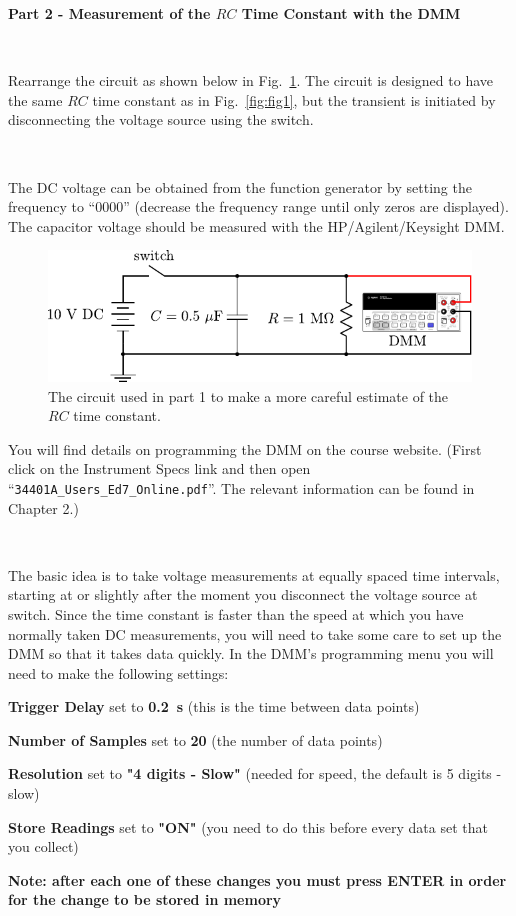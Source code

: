 \documentclass[12pt,oneside,openany,letterpaper]{article}
\newenvironment{packed_item}{
\begin{itemize}
  \setlength{\itemsep}{0pt}
  \setlength{\parskip}{0pt}
  \setlength{\parsep}{0pt}
}{\end{itemize}}
\begin{document}
\clearpage


{\bf Part 2 - Measurement of the $RC$ Time Constant with the DMM}

~

\noindent Rearrange the circuit as shown below in Fig.~\ref{fig:fig2}. The circuit is designed to have the same $RC$ time constant as in Fig.~\ref{fig:fig1}, but the transient is initiated by disconnecting the voltage
source using the switch.

~

\noindent The DC voltage can be obtained from the function generator by setting the frequency to ``0000'' (decrease the frequency range until only zeros are displayed). The capacitor voltage
should be measured with the HP/Agilent/Keysight DMM.

\begin{figure}[h!]
\begin{center}
\includegraphics[width=.8\textwidth]{figures/Lab3Fig2.pdf}\caption{\label{fig:fig2}The circuit used in part 1 to make a more careful estimate of the $RC$ time constant.}
\end{center}
\end{figure}

\noindent You will find details on programming the DMM on the course website. (First click on the Instrument Specs link and then open “\verb|34401A_Users_Ed7_Online.pdf|”. The
relevant information can be found in Chapter 2.)

~

\noindent The basic idea is to take voltage measurements at equally spaced time intervals, starting at or slightly after the moment you disconnect the voltage source at switch. Since the time constant is faster than the speed at which you have normally taken DC measurements, you will need to take some care to set up the DMM so that it takes data quickly. In the DMM's programming menu you will need to make the following settings:

\begin{packed_item}
\item {\bf Trigger Delay} set to {\bf 0.2~s} (this is the time between data points)
\item {\bf Number of Samples} set to {\bf 20} (the number of data points)
\item {\bf Resolution} set to {\bf "4 digits - Slow"} (needed for speed, the default is 5 digits - slow)
\item {\bf Store Readings} set to {\bf "ON"} (you need to do this before every data set that you collect)
\item {\bf Note: after each one of these changes you must press ENTER in order for the change to be stored in memory}
\end{packed_item}
\end{document}
